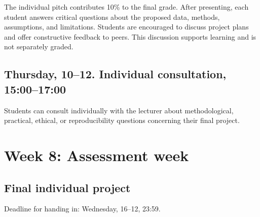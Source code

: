 The individual pitch contributes 10\% to the final grade. After presenting, each student answers critical questions about the proposed data, methods, assumptions, and limitations. Students are encouraged to discuss project plans and offer constructive feedback to peers. This discussion supports learning and is not separately graded.

\subsection*{Thursday, 10--12. Individual consultation, 15:00--17:00}

Students can consult individually with the lecturer about methodological, practical, ethical, or reproducibility questions concerning their final project.


\section*{Week 8: Assessment week}

\subsection*{Final individual project}

Deadline for handing in: Wednesday, 16--12, 23:59.
